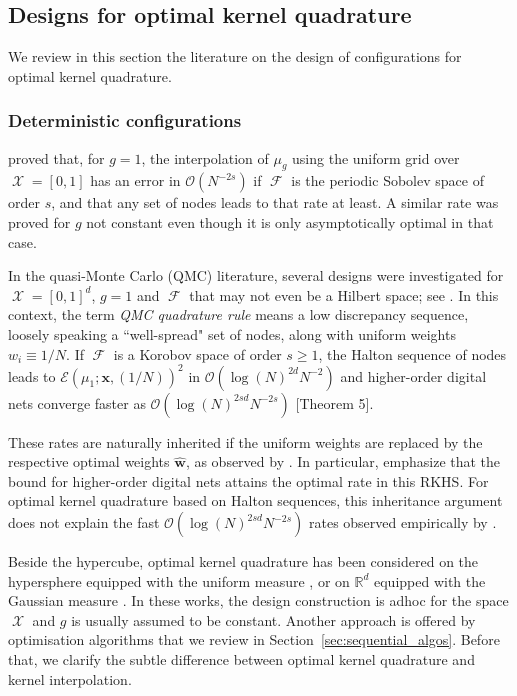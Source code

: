 \documentclass[twoside,11pt]{book}
\numberwithin{theorem}{chapter}
\numberwithin{definition}{chapter}
\numberwithin{proposition}{chapter}
\numberwithin{corollary}{chapter}
\numberwithin{example}{chapter}
\numberwithin{lemma}{chapter}
\DeclareMathOperator{\F}{\mathcal{F}}
\DeclareMathOperator{\X}{\mathcal{X}}
\newcommand{\rb}[1]{\textcolor{magenta}{#1}}
\begin{document}
\subsection{Designs for optimal kernel quadrature}
We review in this section the literature on the design of configurations for optimal kernel quadrature.
\subsubsection{Deterministic configurations}
\cite{Boj81} proved that, for $g=1$, the interpolation of $\mu_{g}$ using the uniform grid over $\X = [0,1]$ has an error in $\mathcal{O}(N^{-2s})$ if $\F$ is the periodic Sobolev space of order $s$, and that any set of nodes leads to that rate at least. A similar rate was proved for $g$ not constant \citep{NoUlWo15} even though it is only asymptotically optimal in that case.

In the quasi-Monte Carlo (QMC) literature, several designs were investigated for $\X = [0,1]^{d}$, $g = 1$ and $\F$ that may not even be a Hilbert space; see \citep{DiPi10}. In this context, the term \emph{QMC quadrature rule} means a low discrepancy sequence, loosely speaking a ``well-spread" set of nodes, along with uniform weights $w_{i} \equiv 1/N$. If $\F$ is a Korobov space of order $s \geq 1$, the Halton sequence of nodes \citep{Hal64} leads to $\mathcal{E}(\mu_1; \bm{x}, (1/N))^2$ in $\mathcal{O}(\log(N)^{2d} N^{-2})$ and higher-order digital nets converge faster as $\mathcal{O}(\log(N)^{2sd} N^{-2s})$ \citep{DiPi14}[Theorem 5].

These rates are naturally inherited if the uniform weights are replaced by the respective optimal weights $\hat{\bm{w}}$, as observed by \cite{BOGOS2019}. In particular, \cite{BOGOS2019} emphasize that the bound for higher-order digital nets attains the optimal rate in this RKHS.
For optimal kernel quadrature based on Halton sequences, this inheritance argument does not explain the fast $\mathcal{O}(\log(N)^{2sd} N^{-2s})$ rates observed empirically by \cite{Oett17}.

Beside the hypercube, optimal kernel quadrature has been considered on the hypersphere equipped with the uniform measure \citep{EhGrCh19}, or on $\mathbb{R}^{d}$ equipped with the Gaussian measure \citep{KaSa19}. In these works, the design construction is adhoc for the space $\X$ and
$g$ is usually assumed to be constant. Another approach is offered by optimisation algorithms that we review in Section~\ref{sec:sequential_algos}. Before that, we clarify the subtle difference between optimal kernel quadrature and kernel interpolation.
\end{document}
